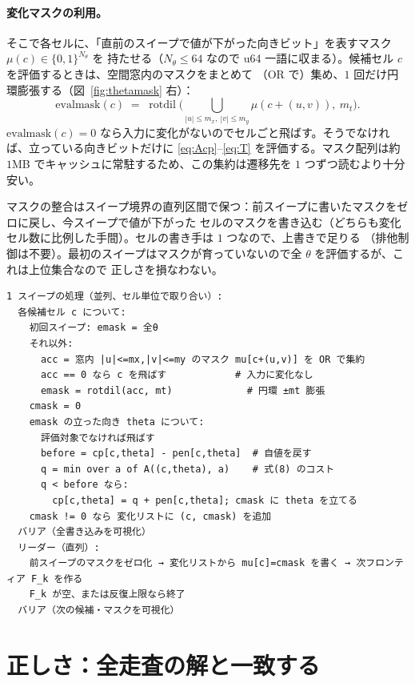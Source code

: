 \documentclass[11pt]{ltjsarticle}
\newcommand{\rotdil}{\operatorname{rotdil}}
\begin{document}
\paragraph{変化マスクの利用。}
そこで各セルに、「直前のスイープで値が下がった向きビット」を表すマスク $\mu(c)\in\{0,1\}^{N_\theta}$ を
持たせる（$N_\theta\le64$ なので u64 一語に収まる）。候補セル $c$ を評価するときは、空間窓内のマスクをまとめて
（OR で）集め、$1$ 回だけ円環膨張する（図~\ref{fig:thetamask} 右）：
\begin{equation}
\mathrm{evalmask}(c)\;=\;\rotdil\!\Big(\bigcup_{|u|\le m_x,\ |v|\le m_y}\mu(c+(u,v)),\ m_t\Big).
\label{eq:evalmask}
\end{equation}
$\mathrm{evalmask}(c)=0$ なら入力に変化がないのでセルごと飛ばす。そうでなければ、立っている向きビットだけに
\eqref{eq:Acp}--\eqref{eq:T} を評価する。マスク配列は約 $1$MB でキャッシュに常駐するため、この集約は遷移先を
$1$ つずつ読むより十分安い。

マスクの整合はスイープ境界の直列区間で保つ：前スイープに書いたマスクをゼロに戻し、今スイープで値が下がった
セルのマスクを書き込む（どちらも変化セル数に比例した手間）。セルの書き手は $1$ つなので、上書きで足りる
（排他制御は不要）。最初のスイープはマスクが育っていないので全 $\theta$ を評価するが、これは上位集合なので
正しさを損なわない。

\begin{verbatim}
1 スイープの処理（並列、セル単位で取り合い）:
  各候補セル c について:
    初回スイープ: emask = 全θ
    それ以外:
      acc = 窓内 |u|<=mx,|v|<=my のマスク mu[c+(u,v)] を OR で集約
      acc == 0 なら c を飛ばす            # 入力に変化なし
      emask = rotdil(acc, mt)             # 円環 ±mt 膨張
    cmask = 0
    emask の立った向き theta について:
      評価対象でなければ飛ばす
      before = cp[c,theta] - pen[c,theta]  # 自値を戻す
      q = min over a of A((c,theta), a)    # 式(8) のコスト
      q < before なら:
        cp[c,theta] = q + pen[c,theta]; cmask に theta を立てる
    cmask != 0 なら 変化リストに (c, cmask) を追加
  バリア（全書き込みを可視化）
  リーダー（直列）:
    前スイープのマスクをゼロ化 → 変化リストから mu[c]=cmask を書く → 次フロンティア F_k を作る
    F_k が空、または反復上限なら終了
  バリア（次の候補・マスクを可視化）
\end{verbatim}

\section{正しさ：全走査の解と一致する}
\label{sec:exact}
\end{document}
